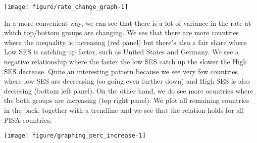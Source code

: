 \documentclass[11pt, a4paper]{article}\usepackage[]{graphicx}\usepackage[]{color}
\begin{document}




{\centering \texttt{[image: figure/rate\_change\_graph-1]} 

}




In a more convenient way, we can see that there is a lot of variance in the rate at which top/bottom groups are changing. We see that there are more countries where the inequality is increasing (red panel) but there's also a fair share where Low SES is catching up faster, such as United States and Germany. We see a negative relationship where the faster the low SES catch up the slower the High SES decrease. Quite an interesting pattern because we see very few countries where low SES are decreasing (so going even further down) and High SES is also decresing (bottom left panel). On the other hand, we do see more ocuntries where the both groups are increasing (top right panel). We plot all remaining countries in the back, together with a trendline and we see that the relation holds for all PISA countries.





{\centering \texttt{[image: figure/graphing\_perc\_increase-1]} 

}










\end{document}
